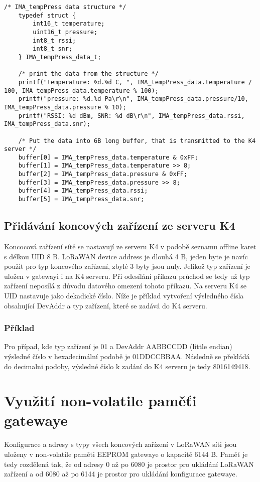 \begin{lstlisting}[style=CStyle]
    /* IMA_tempPress data structure */   
    typedef struct {
        int16_t temperature;
        uint16_t pressure;
        int8_t rssi;
        int8_t snr;
    } IMA_tempPress_data_t;
    
    /* print the data from the structure */
	printf("temperature: %d.%d C, ", IMA_tempPress_data.temperature / 100, IMA_tempPress_data.temperature % 100);
	printf("pressure: %d.%d Pa\r\n", IMA_tempPress_data.pressure/10, IMA_tempPress_data.pressure % 10);
	printf("RSSI: %d dBm, SNR: %d dB\r\n", IMA_tempPress_data.rssi, IMA_tempPress_data.snr);

    /* Put the data into 6B long buffer, that is transmitted to the K4 server */
	buffer[0] = IMA_tempPress_data.temperature & 0xFF;
	buffer[1] = IMA_tempPress_data.temperature >> 8;
	buffer[2] = IMA_tempPress_data.pressure & 0xFF;
	buffer[3] = IMA_tempPress_data.pressure >> 8;
	buffer[4] = IMA_tempPress_data.rssi;
	buffer[5] = IMA_tempPress_data.snr;
\end{lstlisting}


\subsection{Přidávání koncových zařízení ze serveru K4}
Koncocová zařízení sítě se nastavují ze serveru K4 v podobě seznamu offline karet s délkou UID 8 B.
LoRaWAN device address je dlouhá 4 B, jeden byte je navíc použit pro typ koncového zařízení, zbylé 3 byty jsou nuly.
Jelikož typ zařízení je uložen v gatewayi i na K4 serveru. Při odesílání příkazu průchod se tedy už typ zařízení neposílá z důvodu datového omezení tohoto příkazu.
Na serveru K4 se UID nastavuje jako dekadické číslo.
Níže je příklad vytvoření výsledného čísla obsahující DevAddr a typ zařízení, které se zadává do K4 serveru.

\subsubsection{Příklad}
Pro případ, kde typ zařízení je 01 a DevAddr AABBCCDD (little endian) výsledné číslo v hexadecimální podobě je 01DDCCBBAA. Následně se překládá do decimalni podoby, výsledné číslo k zadání do K4 serveru je tedy 8016149418.


\section{Využití non-volatile paměťi gatewaye}
Konfigurace a adresy s typy všech koncových zařízení v LoRaWAN síti jsou uloženy v non-volatile paměti EEPROM gatewaye o kapacitě 6144 B. 
Paměť je tedy rozdělená tak, že od adresy 0 až po 6080 je prostor pro ukládání LoRaWAN zařízení a od 6080 až po 6144 je prostor pro ukládání konfigurace gatewaye.

